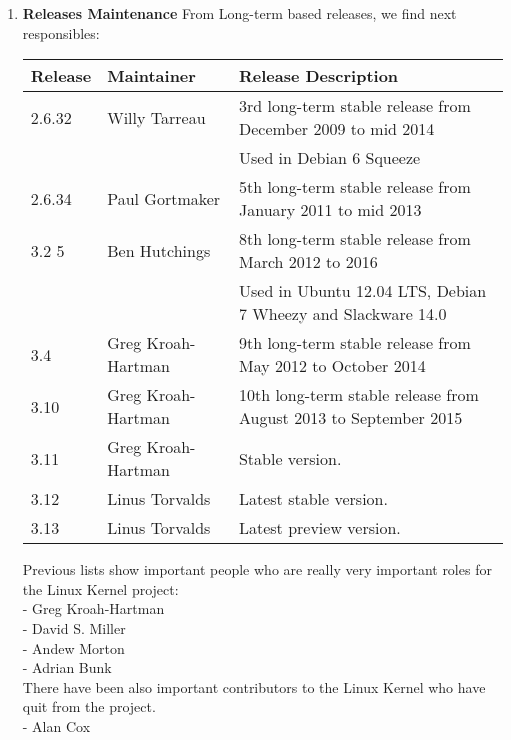 \documentclass[11pt]{article}
\begin{document}
\begin{enumerate}
\item{\textbf{Releases Maintenance}}
From Long-term based releases, we find next responsibles:\\
\begin{center}
    \hspace*{-2cm}\begin{tabular}{ | l | l | l | }
    \hline
    Release & Maintainer & Release Description\\
    \hline
    \hline
    2.6.32 & Willy Tarreau & 3rd long-term stable release from December 2009 to mid 2014\\
    & & Used in Debian 6 Squeeze\\
    \hline
    2.6.34	& Paul Gortmaker & 5th long-term stable release from January 2011 to mid 2013\\
    \hline
    3.2	5  & Ben Hutchings	& 8th long-term stable release from March 2012 to 2016\\
    & & Used in Ubuntu 12.04 LTS, Debian 7 Wheezy and Slackware 14.0\\
    \hline
    3.4	   & Greg Kroah-Hartman & 9th long-term stable release from May 2012 to October 2014\\
    \hline
    3.10   & Greg Kroah-Hartman & 10th long-term stable release from August 2013 to September 2015\\
    \hline
    3.11   & Greg Kroah-Hartman	& Stable version.\\
    \hline
    3.12   & Linus Torvalds	& Latest stable version.\\
    \hline
    3.13   & Linus Torvalds	& Latest preview version.\\
    \hline
    \end{tabular}
\end{center}
    
Previous lists show important people who are really very important roles for the Linux Kernel project:\\
- Greg Kroah-Hartman\\
- David S. Miller\\
- Andew Morton\\
- Adrian Bunk\\
There have been also important contributors to the Linux Kernel who have quit from the project.\\
- Alan Cox
\end{enumerate}
\end{document}
